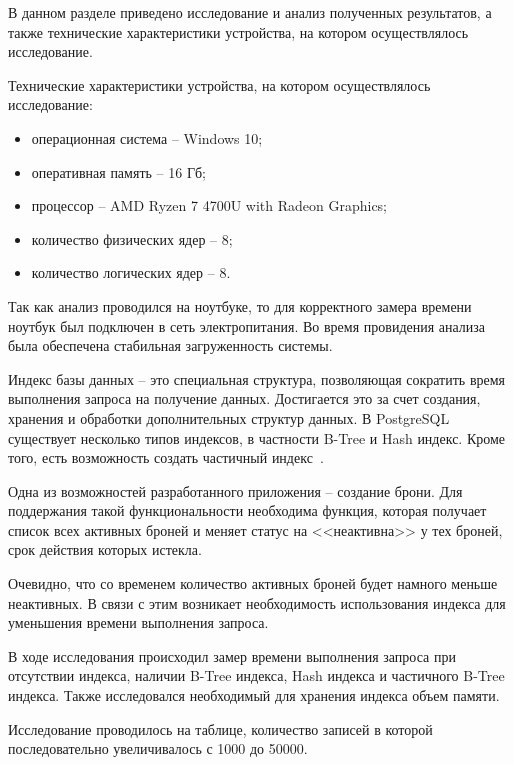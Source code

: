\label{cha:R}
В данном разделе приведено исследование и анализ полученных результатов, а также технические характеристики устройства, на котором осуществлялось исследование.

Технические характеристики устройства, на котором осуществлялось исследование:
\begin{itemize}
	\item операционная система -- Windows 10;
	\item оперативная память -- 16 Гб;
	\item процессор -- AMD Ryzen 7 4700U with Radeon Graphics;
	\item количество физических ядер -- 8;
	\item количество логических ядер -- 8.
\end{itemize}

Так как анализ проводился на ноутбуке, то для корректного замера времени ноутбук был подключен в сеть электропитания. Во время провидения анализа была обеспечена стабильная загруженность системы.

Индекс базы данных -- это специальная структура, позволяющая сократить время выполнения запроса на получение данных. 
Достигается это за счет создания, хранения и обработки дополнительных структур данных.
В PostgreSQL существует несколько типов индексов, в частности B-Tree и Hash индекс. Кроме того, есть возможность создать частичный индекс~\cite{idx}.

Одна из возможностей разработанного приложения -- создание брони. Для поддержания такой функциональности необходима функция, которая получает список всех активных броней и меняет статус на <<неактивна>> у тех броней, срок действия которых истекла.

Очевидно, что со временем количество активных броней будет намного меньше неактивных. В связи с этим возникает необходимость использования индекса для уменьшения времени выполнения запроса.

В ходе исследования происходил замер времени выполнения запроса при отсутствии индекса, наличии B-Tree индекса, Hash индекса и частичного B-Tree индекса.
Также исследовался необходимый для хранения индекса объем памяти.

Исследование проводилось на таблице, количество записей в которой последовательно увеличивалось с 1000 до 50000.

